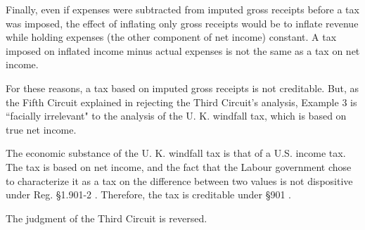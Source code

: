 \begin{select}
Finally, even if expenses were subtracted from imputed gross receipts before a tax was imposed, the effect of inflating only gross receipts would be to inflate revenue while holding expenses (the other component of net income) constant. A tax imposed on inflated income minus actual expenses is not the same as a tax on net income.

For these reasons, a tax based on imputed gross receipts is not creditable. But, as the Fifth Circuit explained in rejecting the Third Circuit's analysis, Example 3 is ``facially irrelevant" to the analysis of the U. K. windfall tax, which is based on true net income.  

The economic substance  of the U. K. windfall tax is that of a U.S. income tax. The tax is based on net income, and the fact that the Labour government chose to characterize it as a tax on the difference between two values is not dispositive under Reg. \S1.901-2 . Therefore, the tax is creditable under \S901 . 

The judgment of the Third Circuit is reversed. 

 \end{select}
 
